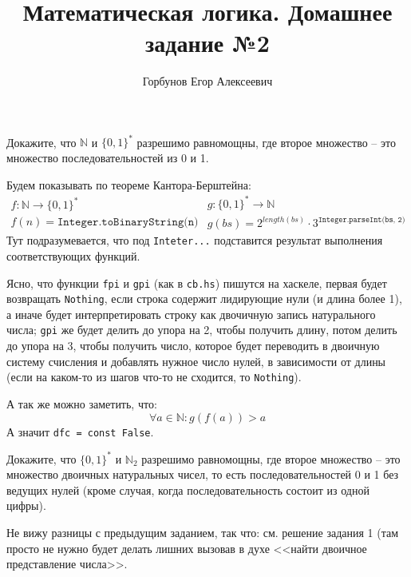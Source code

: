 
\title{Математическая логика. Домашнее задание №2}
\author{Горбунов Егор Алексеевич}


\maketitle

\begin{task}[1]
Докажите, что $\mathbb{N}$ и $\{0,1\}^*$ разрешимо равномощны, где второе множество -- это множество последовательностей из 0 и 1.
\end{task}
\begin{solution}
Будем показывать по теореме Кантора-Берштейна:
\[
	\begin{array}{l}
		f:\mathbb{N} \rightarrow \{0,1\}^* \\
		f(n) = \texttt{Integer.toBinaryString(n)}
	\end{array}
	\begin{array}{l}
		g:\{0,1\}^* \rightarrow \mathbb{N} \\
		g(bs) = 2^{length(bs)}\cdot 3^{\texttt{Integer.parseInt(bs, 2)}}
	\end{array}
\]
Тут подразумевается, что под \texttt{Inteter...} подставится результат выполнения соответствующих функций.

Ясно, что функции \texttt{fpi} и \texttt{gpi} (как в \texttt{cb.hs}) пишутся на хаскеле, первая будет возвращать \texttt{Nothing}, если строка содержит лидирующие нули (и длина более 1), а иначе будет интерпретировать строку как двочичную запись натурального числа; \texttt{gpi} же будет делить до упора на 2, чтобы получить длину, потом делить до упора на 3, чтобы получить число, которое будет переводить в двоичную систему счисления и добавлять нужное число нулей, в зависимости от длины (если на каком-то из шагов что-то не сходится, то \texttt{Nothing}).

А так же можно заметить, что:
\[
		\forall a \in \mathbb{N}:  g(f(a)) > a
\]
А значит \texttt{dfc = const False}. \xqed
\end{solution}

\begin{task}[2]
Докажите, что $\{0,1\}^*$ и $\mathbb{N}_2$ разрешимо равномощны, где второе множество -- это множество двоичных натуральных чисел,
    то есть последовательностей 0 и 1 без ведущих нулей (кроме случая, когда последовательность состоит из одной цифры).
\end{task}
\begin{solution}
Не вижу разницы с предыдущим заданием, так что: см. решение задания 1 (там просто не нужно будет делать лишних вызовав в духе <<найти двоичное представление числа>>. \xqed
\end{solution}

